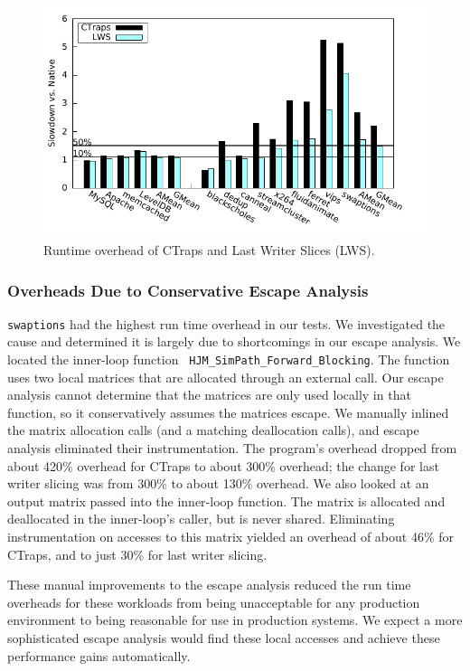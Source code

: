 \documentclass[preprint,9pt]{sigplanconf}
\newcommand{\ctraps}{CTraps\xspace}
\begin{document}
\begin{figure}
\centering
\includegraphics[width=.9\columnwidth]{plots/perf.pdf}
\caption{\label{fig:perfall}Runtime overhead of \ctraps and Last Writer Slices (LWS).}
\end{figure}

\subsubsection{Overheads Due to Conservative Escape Analysis}
\label{sec:eval:conservative}
{\tt swaptions} had the highest run time overhead in our tests.  We
investigated the cause and determined it is largely due to shortcomings in our
escape analysis.  We located the inner-loop function {\tt
HJM\_SimPath\_Forward\_Blocking}.  The function uses two local matrices that
are allocated through an external call.  Our escape analysis cannot determine
that the matrices are only used locally in that function, so it conservatively
assumes the matrices escape.  We manually inlined the matrix allocation calls
(and a matching deallocation calls), and escape analysis eliminated their
instrumentation.  The program's overhead dropped from about 420\% overhead for
\ctraps to about 300\% overhead; the change for last writer slicing was from
300\% to about 130\% overhead.  We also looked at an output matrix passed into
the inner-loop function.  The matrix is allocated and deallocated in the
inner-loop's caller, but is never shared.  Eliminating instrumentation on
accesses to this matrix yielded an overhead of about 46\% for \ctraps, and to
just 30\% for last writer slicing.  

These manual improvements to the escape analysis reduced the run time overheads
for these workloads from being unacceptable for any production environment to
being reasonable for use in production systems.  We expect a more sophisticated
escape analysis would find these local accesses and achieve these performance
gains automatically.
\end{document}
